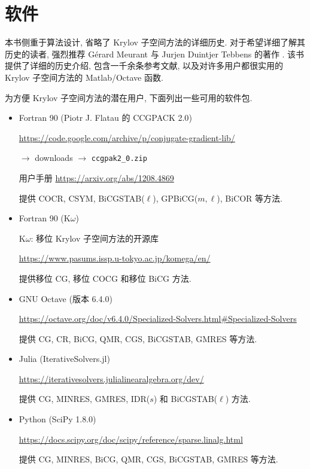 \clearpage\section*{{软件}}
\makeatletter{}\label{chap:software}\makeatother{}

{本书侧重于算法设计, 省略了 Krylov 子空间方法的详细历史. 对于希望详细了解其历史的读者, 强烈推荐 Gérard Meurant 与 Jurjen Duintjer Tebbens 的著作 . 该书提供了详细的历史介绍, 包含一千余条参考文献, 以及对许多用户都很实用的 Krylov 子空间方法的 Matlab/Octave 函数.}

{为方便 Krylov 子空间方法的潜在用户, 下面列出一些可用的软件包.}

\begin{itemize}
\item Fortran 90 ({Piotr J. Flatau 的 CCGPACK 2.0})\par
\url{https://code.google.com/archive/p/conjugate-gradient-lib/}\par
$\to$ downloads $\to$ \texttt{ccgpak2\_0.zip}\par
{用户手册} \url{https://arxiv.org/abs/1208.4869}\par
{提供 COCR, CSYM, BiCGSTAB($\ell$), GPBiCG($m,\ell$), BiCOR 等方法.}

\item Fortran 90 (K$\omega$)\par
{K$\omega$: 移位 Krylov 子空间方法的开源库}\par
\url{https://www.pasums.issp.u-tokyo.ac.jp/komega/en/}\par
{提供移位 CG, 移位 COCG 和移位 BiCG 方法.}

\item GNU Octave ({版本 6.4.0})\par
\url{https://octave.org/doc/v6.4.0/Specialized-Solvers.html#Specialized-Solvers}\par
{提供 CG, CR, BiCG, QMR, CGS, BiCGSTAB, GMRES 等方法.}

\item Julia (IterativeSolvers.jl)\par
\url{https://iterativesolvers.julialinearalgebra.org/dev/}\par
{提供 CG, MINRES, GMRES, IDR($s$) 和 BiCGSTAB($\ell$) 方法.}

\item Python (SciPy 1.8.0)\par
\url{https://docs.scipy.org/doc/scipy/reference/sparse.linalg.html}\par
{提供 CG, MINRES, BiCG, QMR, CGS, BiCGSTAB, GMRES 等方法.}
\end{itemize}
